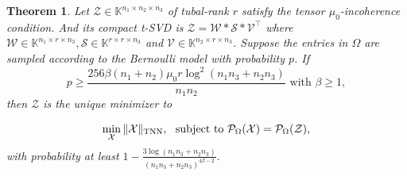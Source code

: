 \documentclass[twoside,12pt]{article}
\newtheorem{theorem}{Theorem}
\newcommand{\TNN}{\textnormal{TNN}}
\begin{document}
\begin{theorem}\label{thm:sr4generalTCB}\rm
Let $\mathcal{Z}\in\mathbb{K}^{n_1 \times n_2 \times n_3}$ of tubal-rank $r$ satisfy the tensor $\mu_0$-incoherence condition. And its compact t-SVD is  $\mathcal{Z}=\mathcal{W} * \mathcal{S} * \mathcal{V}^{\top}$ where $\mathcal{W} \in \mathbb{K}^{n_1 \times r \times n_3}, \mathcal{S} \in \mathbb{K}^{r \times r \times n_3}$ and $\mathcal{V} \in \mathbb{K}^{n_2 \times r \times n_3}$. Suppose the entries in $\Omega$ are sampled according to the Bernoulli model with probability $p$.  If
\begin{equation}\label{ppp}
p \geq \frac{256\beta(n_1+n_2)\mu_0r\log^2(n_1n_3+n_2n_3)}{n_1n_2} \text{~with~}\beta\geq 1,
\end{equation}
then $\mathcal{Z}$ is the unique minimizer to 

\begin{equation*}
\begin{gathered}
\min _{\mathcal{X}}\|\mathcal{X}\|_{\TNN}, ~
\textnormal{ subject to } \mathcal{P}_{\Omega}(\mathcal{X})=\mathcal{P}_{\Omega}(\mathcal{Z}),
\end{gathered}
\end{equation*}
 with probability at least $1- \frac{3\log(n_1n_3+n_2n_3)}{(n_1n_3+n_2n_3)^{4\beta-2}}$.
\end{theorem} 

\end{document}
